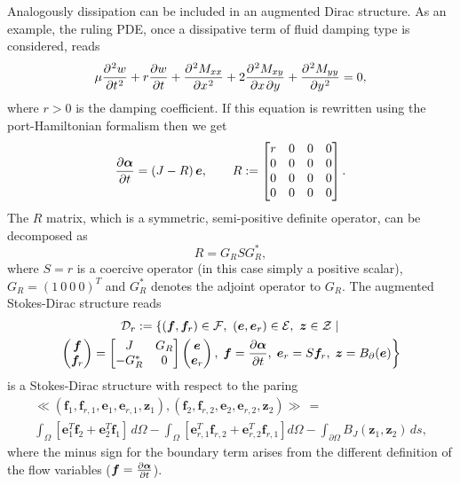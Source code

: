 \documentclass[preprint,12pt]{elsarticle}
\begin{document}
		Analogously dissipation can be included in an augmented Dirac structure. As an example, the ruling PDE, once a dissipative term of fluid damping type is considered, reads
		\begin{equation}
		\mu \diffp[2]{w}{t}  + r \diffp{w}{t}+ \diffp[2]{M_{xx}}{x} + 2 \diffp{M_{xy}}{x,y} + \diffp[2]{M_{yy}}{y} = 0,
		\end{equation}
		where $r>0$ is the damping coefficient.
		If this equation is rewritten using the port-Hamiltonian formalism then we get
		\begin{equation}
		\diffp{\bm\alpha}{t} = \left(J - R \right) \bm{e}, \qquad 
		R := 
		\begin{bmatrix}
		r & 0 & 0 & 0 \\
		0 & 0 & 0 & 0 \\
		0 & 0 & 0 & 0 \\
		0 & 0 & 0 & 0 \\
		\end{bmatrix}.
		\end{equation}
		The $R$ matrix, which is a symmetric, semi-positive definite operator, can be decomposed as
		\begin{equation}
		R = G_R S G_R^* , 
		\end{equation}
		where $S=r$ is a coercive operator (in this case simply a positive scalar), $G_R =  \left(1 \ 0 \ 0 \ 0 \right)^T$ and $G_R^*$ denotes the adjoint operator to $G_R$. The augmented Stokes-Dirac structure reads
		\begin{multline}
		\mathcal{D}_r := \left\{ (\bm{f}, \bm{f}_r) \in \mathcal{F}, \ (\bm{e}, \bm{e}_r) \in \mathcal{E}, \ \bm{z} \in \mathcal{Z} \; |  \right. \\
		\left. 
		\begin{pmatrix}
		\bm{f} \\
		\bm{f}_r \\
		\end{pmatrix}
		= 
		\begin{bmatrix}
		J & G_R \\
		-G_R^* & 0 \\
		\end{bmatrix}
		\begin{pmatrix}
		\bm{e} \\
		\bm{e}_r \\
		\end{pmatrix}, 
		\;\bm{f} = \diffp{\bm{\alpha}}{t}, \; \bm{e}_r = S \bm{f}_r, \;  \bm{z} = B_{\partial}(\bm{e})
		\right\}
		\end{multline}
		is a Stokes-Dirac structure with respect to the paring 
		\begin{multline}
		\ll (\bm{f}_1, \bm{f}_{r, 1}, \bm{e}_1, \bm{e}_{r, 1}, \bm{z}_1), (\bm{f}_2, \bm{f}_{r, 2}, \bm{e}_2, \bm{e}_{r, 2}, \bm{z}_2) \gg  \,= \\
		\int_{\Omega} \left[ \bm{e}_1^T \bm{f}_2 + \bm{e}_2^T \bm{f}_1\right] \,d\Omega - \int_{\Omega} \left[ \bm{e}_{r, 1}^T \bm{f}_{r, 2} + \bm{e}_{r, 2}^T \bm{f}_{r, 1} \right] d\Omega  - \int_{\partial \Omega} B_J(\bm{z}_1, \bm{z}_2) \, ds,
		\end{multline}
		where the minus sign for the boundary term arises from the different definition of the flow variables ($\bm{f}= \diffp{\bm{\alpha}}{t}$).
\end{document}
